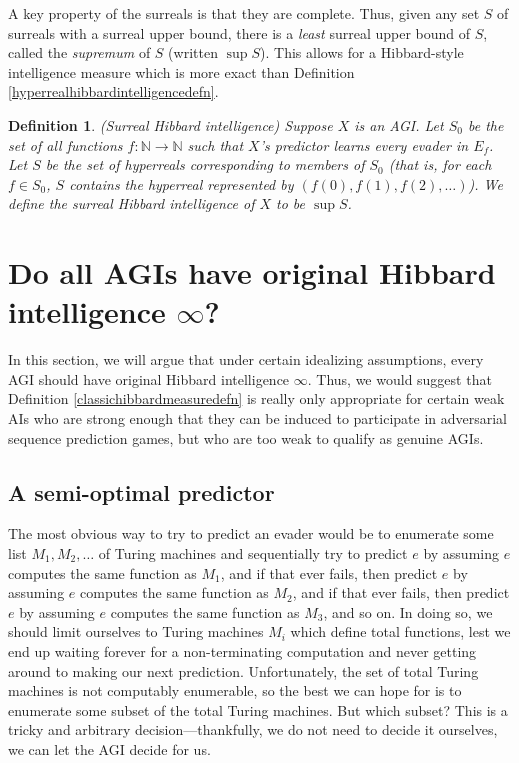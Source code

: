 \documentclass{article}
\newtheorem{definition}[theorem]{Definition}
\begin{document}
A key property of the surreals
is that they are complete. Thus, given any set $S$ of surreals with a surreal upper bound,
there is a \emph{least} surreal upper bound of $S$, called the \emph{supremum} of $S$
(written $\sup S$). This allows for a Hibbard-style intelligence measure which is more
exact than Definition \ref{hyperrealhibbardintelligencedefn}.

\begin{definition}
    (Surreal Hibbard intelligence)
    Suppose $X$ is an AGI. Let $S_0$ be the set of all functions $f:\mathbb N\to\mathbb N$
    such that $X$'s predictor learns every evader in $E_f$.
    Let $S$ be the set of hyperreals corresponding to members of $S_0$ (that is,
    for each $f\in S_0$, $S$ contains the hyperreal represented by $(f(0),f(1),f(2),\ldots)$).
    We define the \emph{surreal Hibbard intelligence} of $X$ to be
    $\sup S$.
\end{definition}






\section{Do all AGIs have original Hibbard intelligence $\infty$?}
\label{trivialitysection}

In this section, we will argue that under certain idealizing
assumptions, every AGI should have original Hibbard intelligence $\infty$.
Thus, we would suggest that Definition \ref{classichibbardmeasuredefn} is really
only appropriate for certain weak AIs who are strong enough that they can be
induced to participate in adversarial sequence prediction games, but who are
too weak to qualify as genuine AGIs.


\subsection{A semi-optimal predictor}
\label{semioptimalpredictorsubsection}

The most obvious way to try to predict an evader would be to
enumerate some list $M_1,M_2,\ldots$ of Turing machines and
sequentially try to predict $e$ by assuming $e$ computes the same
function as $M_1$, and if that ever fails, then predict $e$ by
assuming $e$ computes the same function as $M_2$, and if that ever
fails, then predict $e$ by assuming $e$ computes the same function
as $M_3$, and so on. In doing so, we should limit ourselves
to Turing machines $M_i$ which define total functions, lest
we end up waiting forever for a non-terminating computation
and never getting around to making our next
prediction. Unfortunately, the set of total Turing machines is
not computably enumerable, so the best we can hope for is to enumerate
some subset of the total Turing machines. But which subset? This is
a tricky and arbitrary decision---thankfully, we do not need to
decide it ourselves, we can let the AGI decide for us.
\end{document}
